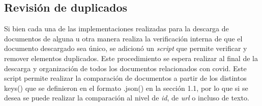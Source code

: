 \subsection{Revisión de duplicados}

Si bien cada una de las implementaciones realizadas para la descarga de documentos de alguna u otra manera realiza la verificación interna de que el documento descargado sea único, se adicionó un \textit{script} que permite verificar y remover elementos duplicados. Este procedimiento se espera realizar al final de la descarga y organización de todos los documentos relacionados con covid. Este script permite realizar la comparación de documentos a partir de los distintos keys() que se definieron en el formato .json() en la sección 1.1, por lo que si se desea se puede realizar la comparación al nivel de \textit{id}, de \textit{url} o incluso de texto.